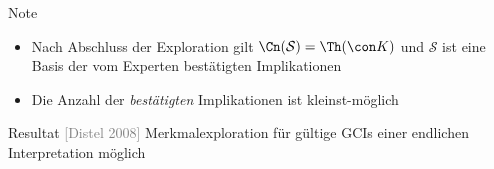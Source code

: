 \documentclass[ngerman]{beamer}
\newcommand{\pseudocite}[1]{\textcolor{gray}{[#1]}}
\begin{document}
\begin{frame}[label=current]

  \vspace*{-4ex}
  \begin{block}{Note}
    \begin{itemize}
    \item<10-> Nach Abschluss der Exploration gilt $\Cn(\mathcal{S}) = \Th(\con K)$ und
      $\mathcal{S}$ ist eine Basis der vom Experten bestätigten Implikationen
    \item<11-> Die Anzahl der \emph{bestätigten} Implikationen ist kleinst-möglich
    \end{itemize}
  \end{block}


  \begin{block}{Resultat \pseudocite{Distel 2008}}
    Merkmalexploration für gültige GCIs einer endlichen Interpretation möglich
  \end{block}
  
\end{frame}
\end{document}
